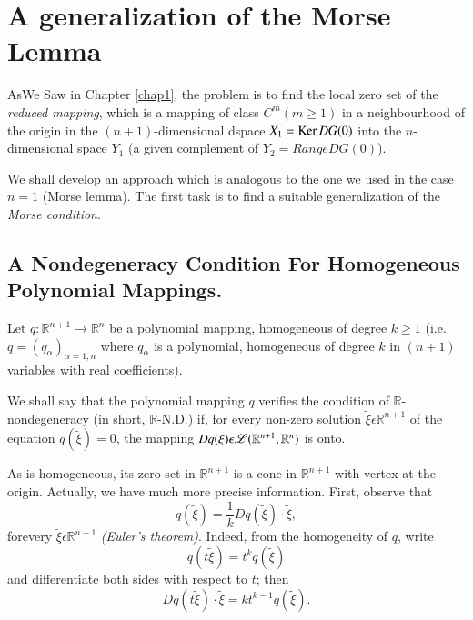 

\chapter{A generalization of the Morse Lemma}\label{chap2}

As\pageoriginale We Saw in Chapter \ref{chap1}, the problem is to find the local zero set of the {\em reduced mapping}, which is a mapping of class $C^{m}(m \geq 1)$ in a neighbourhood of the origin in the $(n+1)$-dimensional dspace $X_{1} = \operatorname{Ker} DG(0)$ into the $n$-dimensional space $Y_{1}$ (a given complement of $Y_{2} = Range DG(0)$).

We shall develop an approach which is analogous to the one we used in the case $n = 1$ (Morse lemma). The first task is to find a suitable generalization of the {\em Morse condition}.

\section[A Nondegeneracy Condition For.........]{A Nondegeneracy Condition For Homogeneous Polynomial Mappings.}\label{chap2-sec1}

Let $q : \mathbb{R}^{n+1} \to \mathbb{R}^{n}$ be a polynomial mapping, homogeneous of degree $k \geq 1$ (i.e. $q = (q_{\alpha})_{\alpha=1, n}$ where $q_{\alpha}$ is a polynomial, homogeneous of degree $k$ in $(n+1)$ variables with real coefficients).

\begin{definition}\label{chap2-def1.1}
We shall say that the polynomial mapping $q$ verifies the condition of $\mathbb{R}$-nondegeneracy (in short, $\mathbb{R}$-N.D.) if, for every non-zero solution $\widetilde{\xi} \epsilon \mathbb{R}^{n+1}$ of the equation $q(\widetilde{\xi}) = 0$, the mapping $Dq(\xi) \epsilon \mathscr{L} (\mathbb{R}^{n+1},\break \mathbb{R}^{n})$ is onto.
\end{definition}

As is homogeneous, its zero set in $\mathbb{R}^{n+1}$ is a cone in $\mathbb{R}^{n+1}$ with vertex at the origin. Actually, we have much more precise information. First, observe that
\begin{equation*}
q(\widetilde{\xi}) = \frac{1}{k} Dq(\widetilde{\xi}) \cdot \widetilde{\xi},\tag{1.1}\label{chap2-eq1.1}
\end{equation*}
for\pageoriginale every $\widetilde{\xi} \epsilon \mathbb{R}^{n+1}$ {\em (Euler's theorem)}. Indeed, from the homogeneity of $q$, write
$$
q(t \widetilde{\xi}) = t^{k}q(\widetilde{\xi})
$$
and differentiate both sides with respect to $t$; then
$$
Dq(t\widetilde{\xi}) \cdot \widetilde{\xi} = kt^{k-1} q(\widetilde{\xi}).
$$

